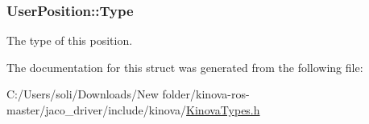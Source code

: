 \subsubsection[{\texorpdfstring{Type}{Type}}]{ User\+Position\+::\+Type}\hypertarget{struct_user_position_a93c748d4ee51239fcbcd487d88e52ffa}{}\label{struct_user_position_a93c748d4ee51239fcbcd487d88e52ffa}


The type of this position. 



The documentation for this struct was generated from the following file\+:\begin{DoxyCompactItemize}
\item 
C\+:/\+Users/soli/\+Downloads/\+New folder/kinova-\/ros-\/master/jaco\+\_\+driver/include/kinova/\hyperlink{_kinova_types_8h}{Kinova\+Types.\+h}\end{DoxyCompactItemize}
